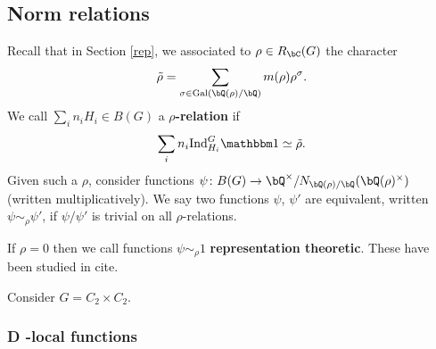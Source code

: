 \subsection{Norm relations}

Recall that in Section \ref{rep}, we associated to $\rho \in R_{\bC}(G)$ the character
    \[ \tilde{\rho} = \sum_{\sigma \in \Gal(\bQ(\rho) / \bQ)} m(\rho) \rho^{\sigma} .\]
 We call $\sum_i n_i H_i \in B(G)$ a \textbf{$\rho$-relation} if 
    \[ \sum_i n_i \Ind_{H_i}^G \trivial \simeq \tilde{\rho}. \]
Given such a $\rho$, consider functions $\psi \colon B(G) \to \bQ^{\times} / N_{\bQ(\rho) / \bQ}(\bQ(\rho)^\times)$ (written multiplicatively). We say two functions $\psi$, $\psi'$ are equivalent, written $\psi \sim_{\rho} \psi'$, if $\psi / \psi'$ is trivial on all $\rho$-relations. 

\begin{rem}
    If $\rho = 0$ then we call functions $\psi \sim_{\rho} 1$ \textbf{representation theoretic}. These have been studied in {\color{red} cite}.
\end{rem}


\begin{example}
    Consider $G = C_2 \times C_2$.
\end{example}
\subsubsection{D -local functions}



